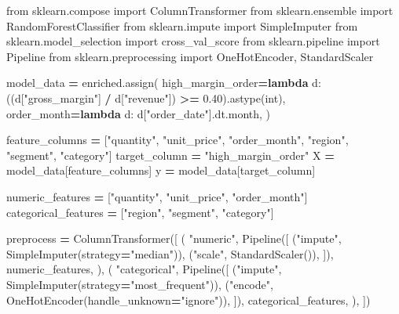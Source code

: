 \documentclass[
  12pt,
]{article}
\newenvironment{Shaded}{\begin{snugshade}}{\end{snugshade}}
\newcommand{\BuiltInTok}[1]{#1}
\newcommand{\FloatTok}[1]{\textcolor[rgb]{0.00,0.00,0.81}{#1}}
\newcommand{\ImportTok}[1]{#1}
\newcommand{\KeywordTok}[1]{\textcolor[rgb]{0.13,0.29,0.53}{\textbf{#1}}}
\newcommand{\NormalTok}[1]{#1}
\newcommand{\OperatorTok}[1]{\textcolor[rgb]{0.81,0.36,0.00}{\textbf{#1}}}
\newcommand{\StringTok}[1]{\textcolor[rgb]{0.31,0.60,0.02}{#1}}
\begin{document}
\begin{Shaded}
\begin{Highlighting}[]
\ImportTok{from}\NormalTok{ sklearn.compose }\ImportTok{import}\NormalTok{ ColumnTransformer}
\ImportTok{from}\NormalTok{ sklearn.ensemble }\ImportTok{import}\NormalTok{ RandomForestClassifier}
\ImportTok{from}\NormalTok{ sklearn.impute }\ImportTok{import}\NormalTok{ SimpleImputer}
\ImportTok{from}\NormalTok{ sklearn.model\_selection }\ImportTok{import}\NormalTok{ cross\_val\_score}
\ImportTok{from}\NormalTok{ sklearn.pipeline }\ImportTok{import}\NormalTok{ Pipeline}
\ImportTok{from}\NormalTok{ sklearn.preprocessing }\ImportTok{import}\NormalTok{ OneHotEncoder, StandardScaler}

\NormalTok{model\_data }\OperatorTok{=}\NormalTok{ enriched.assign(}
\NormalTok{    high\_margin\_order}\OperatorTok{=}\KeywordTok{lambda}\NormalTok{ d: ((d[}\StringTok{"gross\_margin"}\NormalTok{] }\OperatorTok{/}\NormalTok{ d[}\StringTok{"revenue"}\NormalTok{]) }\OperatorTok{\textgreater{}=} \FloatTok{0.40}\NormalTok{).astype(}\BuiltInTok{int}\NormalTok{),}
\NormalTok{    order\_month}\OperatorTok{=}\KeywordTok{lambda}\NormalTok{ d: d[}\StringTok{"order\_date"}\NormalTok{].dt.month,}
\NormalTok{)}

\NormalTok{feature\_columns }\OperatorTok{=}\NormalTok{ [}\StringTok{"quantity"}\NormalTok{, }\StringTok{"unit\_price"}\NormalTok{, }\StringTok{"order\_month"}\NormalTok{, }\StringTok{"region"}\NormalTok{, }\StringTok{"segment"}\NormalTok{, }\StringTok{"category"}\NormalTok{]}
\NormalTok{target\_column }\OperatorTok{=} \StringTok{"high\_margin\_order"}
\NormalTok{X }\OperatorTok{=}\NormalTok{ model\_data[feature\_columns]}
\NormalTok{y }\OperatorTok{=}\NormalTok{ model\_data[target\_column]}

\NormalTok{numeric\_features }\OperatorTok{=}\NormalTok{ [}\StringTok{"quantity"}\NormalTok{, }\StringTok{"unit\_price"}\NormalTok{, }\StringTok{"order\_month"}\NormalTok{]}
\NormalTok{categorical\_features }\OperatorTok{=}\NormalTok{ [}\StringTok{"region"}\NormalTok{, }\StringTok{"segment"}\NormalTok{, }\StringTok{"category"}\NormalTok{]}

\NormalTok{preprocess }\OperatorTok{=}\NormalTok{ ColumnTransformer([}
\NormalTok{    (}
        \StringTok{"numeric"}\NormalTok{,}
\NormalTok{        Pipeline([}
\NormalTok{            (}\StringTok{"impute"}\NormalTok{, SimpleImputer(strategy}\OperatorTok{=}\StringTok{"median"}\NormalTok{)),}
\NormalTok{            (}\StringTok{"scale"}\NormalTok{, StandardScaler()),}
\NormalTok{        ]),}
\NormalTok{        numeric\_features,}
\NormalTok{    ),}
\NormalTok{    (}
        \StringTok{"categorical"}\NormalTok{,}
\NormalTok{        Pipeline([}
\NormalTok{            (}\StringTok{"impute"}\NormalTok{, SimpleImputer(strategy}\OperatorTok{=}\StringTok{"most\_frequent"}\NormalTok{)),}
\NormalTok{            (}\StringTok{"encode"}\NormalTok{, OneHotEncoder(handle\_unknown}\OperatorTok{=}\StringTok{"ignore"}\NormalTok{)),}
\NormalTok{        ]),}
\NormalTok{        categorical\_features,}
\NormalTok{    ),}
\NormalTok{])}


\end{Highlighting}
\end{Shaded}
\end{document}
